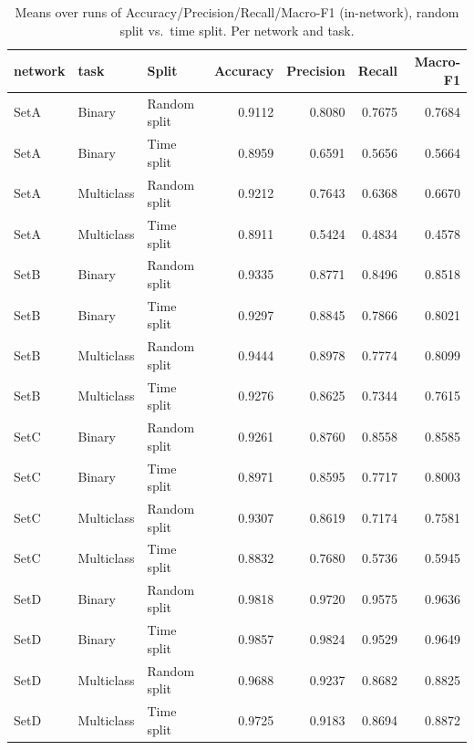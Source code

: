 \begin{table}
\caption{Means over runs of Accuracy/Precision/Recall/Macro-F1 (in-network), random split vs.\ time split. Per network and task.}
\label{tab:q2_appendix_per_network}
\begin{tabular}{lllrrrr}
\toprule
network & task & Split & Accuracy & Precision & Recall & Macro-F1 \\
\midrule
SetA & Binary & Random split & 0.9112 & 0.8080 & 0.7675 & 0.7684 \\
SetA & Binary & Time split & 0.8959 & 0.6591 & 0.5656 & 0.5664 \\
SetA & Multiclass & Random split & 0.9212 & 0.7643 & 0.6368 & 0.6670 \\
SetA & Multiclass & Time split & 0.8911 & 0.5424 & 0.4834 & 0.4578 \\
SetB & Binary & Random split & 0.9335 & 0.8771 & 0.8496 & 0.8518 \\
SetB & Binary & Time split & 0.9297 & 0.8845 & 0.7866 & 0.8021 \\
SetB & Multiclass & Random split & 0.9444 & 0.8978 & 0.7774 & 0.8099 \\
SetB & Multiclass & Time split & 0.9276 & 0.8625 & 0.7344 & 0.7615 \\
SetC & Binary & Random split & 0.9261 & 0.8760 & 0.8558 & 0.8585 \\
SetC & Binary & Time split & 0.8971 & 0.8595 & 0.7717 & 0.8003 \\
SetC & Multiclass & Random split & 0.9307 & 0.8619 & 0.7174 & 0.7581 \\
SetC & Multiclass & Time split & 0.8832 & 0.7680 & 0.5736 & 0.5945 \\
SetD & Binary & Random split & 0.9818 & 0.9720 & 0.9575 & 0.9636 \\
SetD & Binary & Time split & 0.9857 & 0.9824 & 0.9529 & 0.9649 \\
SetD & Multiclass & Random split & 0.9688 & 0.9237 & 0.8682 & 0.8825 \\
SetD & Multiclass & Time split & 0.9725 & 0.9183 & 0.8694 & 0.8872 \\
\bottomrule
\end{tabular}
\end{table}

